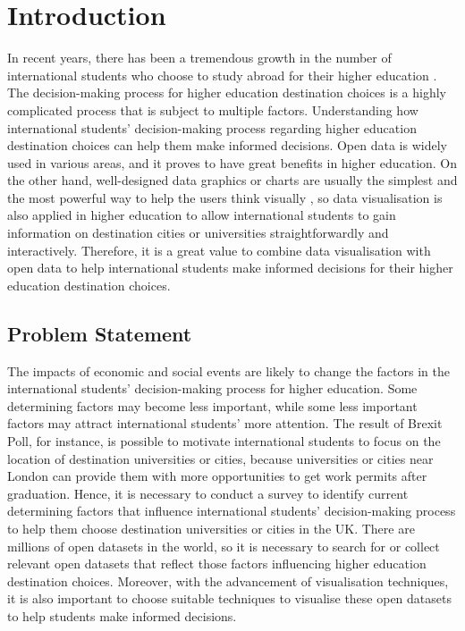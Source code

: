 
\chapter{Introduction} \label{Chapter:Introduction}
In recent years, there has been a tremendous growth in the number of international students who choose to study abroad for their higher education \cite{ahmad2015investigation}. The decision-making process for higher education destination choices is a highly complicated process that is subject to multiple factors. Understanding how international students’ decision-making process regarding higher education destination choices can help them make informed decisions. Open data is widely used in various areas, and it proves to have great benefits in higher education. On the other hand, well-designed data graphics or charts are usually the simplest and the most powerful way to help the users think visually \cite{aljehane2015visualizing}, so data visualisation is also applied in higher education to allow international students to gain information on destination cities or universities straightforwardly and interactively. Therefore, it is a great value to combine data visualisation with open data to help international students make informed decisions for their higher education destination choices.



\section{Problem Statement
}

The impacts of economic and social events are likely to change the factors in the international students’ decision-making process for higher education. Some determining factors may become less important, while some less important factors may attract international students’ more attention. The result of Brexit Poll, for instance, is possible to motivate international students to focus on the location of destination universities or cities, because universities or cities near London can provide them with more opportunities to get work permits after graduation. Hence, it is necessary to conduct a survey to identify current determining factors that influence international students’ decision-making process to help them choose destination universities or cities in the UK. There are millions of open datasets in the world, so it is necessary to search for or collect relevant open datasets that reflect those factors influencing higher education destination choices. Moreover, with the advancement of visualisation techniques, it is also important to choose suitable techniques to visualise these open datasets to help students make informed decisions.



